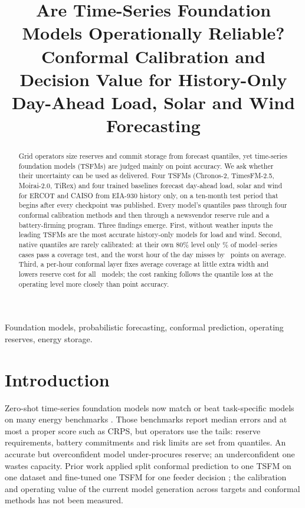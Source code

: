 \documentclass[conference]{IEEEtran}
\begin{document}
\title{Are Time-Series Foundation Models Operationally Reliable? Conformal Calibration and Decision Value for History-Only Day-Ahead Load, Solar and Wind Forecasting}

\author{
}

\maketitle

\begin{abstract}
Grid operators size reserves and commit storage from forecast quantiles, yet time-series foundation models (TSFMs) are judged mainly on point accuracy. We ask whether their uncertainty can be used as delivered. Four TSFMs (Chronos-2, TimesFM-2.5, Moirai-2.0, TiRex) and four trained baselines forecast day-ahead load, solar and wind for ERCOT and CAISO from EIA-930 history only, on a ten-month test period that begins after every checkpoint was published. Every model's quantiles pass through four conformal calibration methods and then through a newsvendor reserve rule and a battery-firming program. Three findings emerge. First, without weather inputs the leading TSFMs are the most accurate history-only models for load and wind. Second, native quantiles are rarely calibrated: at their own 80\% level only \nativeEightyKupPass\% of model--series cases pass a coverage test, and the worst hour of the day misses by \nativeEightyWorstHour\ points on average. Third, a per-hour conformal layer fixes average coverage at little extra width and lowers reserve cost for all \calNativeN\ models; the cost ranking follows the quantile loss at the operating level more closely than point accuracy.
\end{abstract}

\begin{IEEEkeywords}
Foundation models, probabilistic forecasting, conformal prediction, operating reserves, energy storage.
\end{IEEEkeywords}

\section{Introduction}
Zero-shot time-series foundation models now match or beat task-specific models on many energy benchmarks \cite{prior_ercot_tsfm,prior_fets,prior_consumer}. Those benchmarks report median errors and at most a proper score such as CRPS, but operators use the tails: reserve requirements, battery commitments and risk limits are set from quantiles. An accurate but overconfident model under-procures reserve; an underconfident one wastes capacity. Prior work applied split conformal prediction to one TSFM on one dataset \cite{prior_conformal_ercot} and fine-tuned one TSFM for one feeder decision \cite{prior_dfl}; the calibration and operating value of the current model generation across targets and conformal methods has not been measured.
\end{document}

